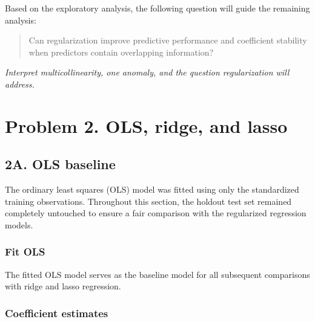 \documentclass[
  11pt,
]{article}
\newenvironment{Shaded}{\begin{snugshade}}{\end{snugshade}}
\newcommand{\AttributeTok}[1]{\textcolor[rgb]{0.13,0.29,0.53}{#1}}
\newcommand{\FunctionTok}[1]{\textcolor[rgb]{0.13,0.29,0.53}{\textbf{#1}}}
\newcommand{\NormalTok}[1]{#1}
\newcommand{\OtherTok}[1]{\textcolor[rgb]{0.56,0.35,0.01}{#1}}
\newcommand{\SpecialCharTok}[1]{\textcolor[rgb]{0.81,0.36,0.00}{\textbf{#1}}}
\begin{document}
Based on the exploratory analysis, the following question will guide the
remaining analysis:

\begin{quote}
Can regularization improve predictive performance and coefficient
stability when predictors contain overlapping information?
\end{quote}

\emph{Interpret multicollinearity, one anomaly, and the question
regularization will address.}

\section{Problem 2. OLS, ridge, and
lasso}\label{problem-2.-ols-ridge-and-lasso}

\subsection{2A. OLS baseline}\label{a.-ols-baseline}

The ordinary least squares (OLS) model was fitted using only the
standardized training observations. Throughout this section, the holdout
test set remained completely untouched to ensure a fair comparison with
the regularized regression models.

\subsubsection{Fit OLS}\label{fit-ols}

\begin{Shaded}
\end{Shaded}

The fitted OLS model serves as the baseline model for all subsequent
comparisons with ridge and lasso regression.

\subsubsection{Coefficient estimates}\label{coefficient-estimates}
\end{document}
